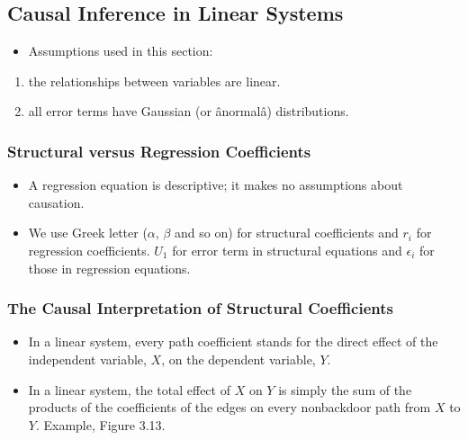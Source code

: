 \documentclass[]{article}
\providecommand{\tightlist}{%
  \setlength{\itemsep}{0pt}\setlength{\parskip}{0pt}}
\begin{document}
\subsection{Causal Inference in Linear
Systems}\label{causal-inference-in-linear-systems}

\begin{itemize}
\tightlist
\item
  Assumptions used in this section:
\end{itemize}

\begin{enumerate}
\def\labelenumi{\arabic{enumi}.}
\tightlist
\item
  the relationships between variables are linear.
\item
  all error terms have Gaussian (or ânormalâ) distributions.
\end{enumerate}

\subsubsection{Structural versus Regression
Coefficients}\label{structural-versus-regression-coefficients}

\begin{itemize}
\item
  A regression equation is descriptive; it makes no assumptions about
  causation.
\item
  We use Greek letter (\(\alpha\), \(\beta\) and so on) for structural
  coefficients and \(r_i\) for regression coefficients. \(U_1\) for
  error term in structural equations and \(\epsilon_i\) for those in
  regression equations.
\end{itemize}

\subsubsection{The Causal Interpretation of Structural
Coefficients}\label{the-causal-interpretation-of-structural-coefficients}

\begin{itemize}
\item
  In a linear system, every path coefficient stands for the direct
  effect of the independent variable, \(X\), on the dependent variable,
  \(Y\).
\item
  In a linear system, the total effect of \(X\) on \(Y\) is simply the
  sum of the products of the coefficients of the edges on every
  nonbackdoor path from \(X\) to \(Y\). Example, Figure 3.13.
\end{itemize}
\end{document}
